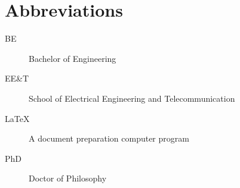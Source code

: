 \chapter*{Abbreviations}\label{abbr}
\begin{description}
\item[BE] Bachelor of Engineering
\item[EE\&T] School of Electrical Engineering and Telecommunication
\item[\LaTeX] A document preparation computer program
\item[PhD] Doctor of Philosophy
\end{description}
